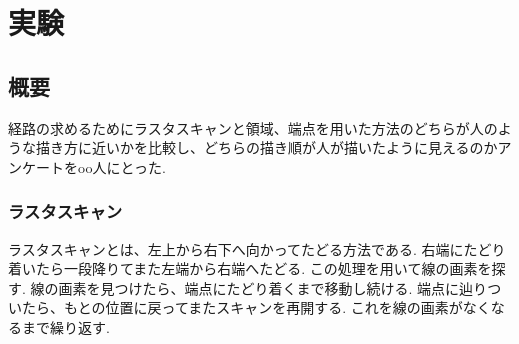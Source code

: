 \chapter{実験}
  \label{chap:experiment}
  \section{概要}
    \label{sec:summary}
	経路の求めるためにラスタスキャンと領域、端点を用いた方法のどちらが人のような描き方に近いかを比較し、どちらの描き順が人が描いたように見えるのかアンケートをoo人にとった.
	\subsection{ラスタスキャン}
	\label{subsec:rastascan}
	ラスタスキャンとは、左上から右下へ向かってたどる方法である. 右端にたどり着いたら一段降りてまた左端から右端へたどる. この処理を用いて線の画素を探す. 線の画素を見つけたら、端点にたどり着くまで移動し続ける. 端点に辿りついたら、もとの位置に戻ってまたスキャンを再開する. これを線の画素がなくなるまで繰り返す.

